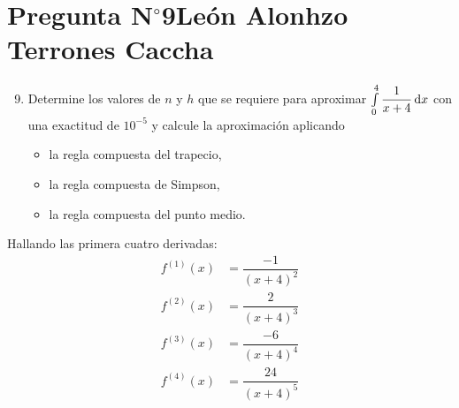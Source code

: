 \section{Pregunta N$^{\circ}$9\qquad León Alonhzo Terrones Caccha}

\begin{frame}
    \begin{enumerate}\setcounter{enumi}{8}
        \item

              Determine los valores de $n$ y $h$ que se requiere para
              aproximar
              \begin{math}
                  \int\limits_{0}^{4}
                  \dfrac{1}{x+4}
                  \dl x
              \end{math}
              con una exactitud de $10^{-5}$ y calcule la
              aproximación aplicando

              \begin{itemize}
                  \item

                        la regla compuesta del trapecio,

                  \item

                        la regla compuesta de Simpson,

                  \item

                        la regla compuesta del punto medio.
              \end{itemize}
    \end{enumerate}

    \begin{solution}
        Hallando las primera cuatro derivadas:
        \begin{align*}
            f^{\left(1\right)}\left(x\right) &
            =\dfrac{-1}{{\left(x+4\right)}^{2}} \\
            f^{\left(2\right)}\left(x\right) &
            =\dfrac{2}{{\left(x+4\right)}^{3}}  \\
            f^{\left(3\right)}\left(x\right) &
            =\dfrac{-6}{{\left(x+4\right)}^{4}} \\
            f^{\left(4\right)}\left(x\right) &
            =\dfrac{24}{{\left(x+4\right)}^{5}}
        \end{align*}
    \end{solution}
\end{frame}

